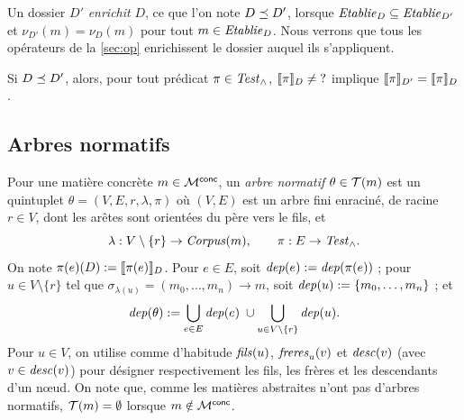 \documentclass[review]{jflart}
\begin{document}
Un dossier \(D'\) \emph{enrichit} \(D\), ce que l'on note \(D\mathrel{\preceq} D'\),
lorsque \(\mathit{Etablie}_D\subseteq\mathit{Etablie}_{D'}\) et \(\nu_{D'}(m)=\nu_D(m)\) pour
tout \(m\in\mathit{Etablie}_D\). Nous verrons que tous les opérateurs de la \autoref{sec:op} enrichissent le dossier
auquel ils s'appliquent.

\begin{lemm}\label{lem:monotone}
Si \(D\mathrel{\preceq} D'\), alors, pour tout prédicat \(\pi\in\mathit{Test}_{{}\wedge{}}\),
\(\llbracket \pi\rrbracket_D\neq\mathord{?}\) implique \(\llbracket \pi\rrbracket_{D'}=\llbracket \pi\rrbracket_D\).
\end{lemm}

\subsection{Arbres normatifs}

\begin{defi}\label{def:normative-tree}
Pour une matière concrète \(m\in\mathcal{M}^{\mathsf{conc}}\), un \emph{arbre normatif} \(\theta\in\mathcal{T}(m)\) est un
quintuplet \(\theta=(V,E,r,\lambda,\pi)\) où \((V,E)\) est un arbre fini
enraciné, de racine \(r\in V\), dont les arêtes sont orientées du père vers
le fils, et
\[
 \lambda:V\setminus\{r\}\to\mathit{Corpus}(m),\qquad
 \pi:E\to\mathit{Test}_{{}\wedge{}}.
\]
On note \(\pi(e)(D):=\llbracket \pi(e)\rrbracket_D\). Pour \(e\in E\), soit
\(\mathit{dep}(e):=\mathit{dep}(\pi(e))\) ; pour \(u\in V\setminus\{r\}\) tel que
\(\sigma_{\lambda(u)}=(m_0,\ldots,m_n)\to m\), soit
\(\mathit{dep}(u):=\{m_0,\ldots,m_n\}\) ; et
\[
 \mathit{dep}(\theta):=\bigcup_{e\in E}\mathit{dep}(e)\;\cup
                      \bigcup_{u\in V\setminus\{r\}}\mathit{dep}(u).
\]
Pour \(u\in V\), on utilise comme d'habitude \(\mathit{fils}(u)\), \(\mathit{freres}_u(v)\) et
\(\mathit{desc}(v)\) (avec \(v\in\mathit{desc}(v)\)) pour désigner respectivement les fils, les
frères et les descendants d'un nœud. On note que, comme les matières abstraites n'ont pas d'arbres
normatifs, \(\mathcal{T}(m)=\emptyset\) lorsque \(m\notin\mathcal{M}^{\mathsf{conc}}\).
\end{defi}
\end{document}
